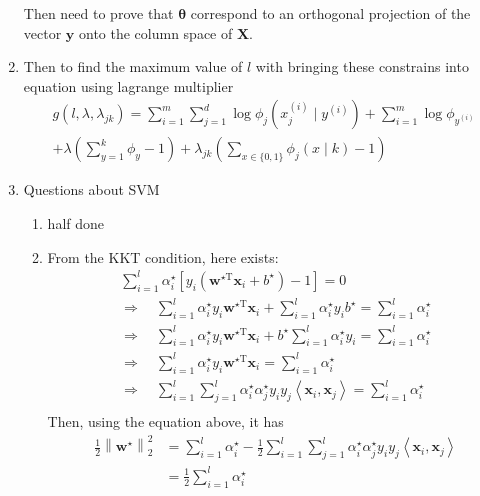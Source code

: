 \documentclass[a4paper]{article}
\begin{document}
\begin{enumerate}
Then need to prove that $\boldsymbol{\theta}$ correspond to an orthogonal projection of the vector $\boldsymbol{y}$ onto the column space of $\boldsymbol{X}$.

\item Then to find the maximum value of $l$ with bringing these constrains into equation using lagrange multiplier
\begin{equation*}
  \begin{aligned}
    g(l, \lambda, \lambda_{jk}) = \sum_{i = 1}^m \sum_{j = 1}^d \log \phi_j (x^{(i)}_j \mid y^{(i)}) + \sum_{i = 1}^m \log \phi_{y^{(i)}} \\
      + \lambda(\sum_{y=1}^k\phi_y - 1) +\lambda_{jk}(\sum_{x \in \{0,1\}}\phi_j(x \mid k)-1)
  \end{aligned}
\end{equation*}
\item Questions about SVM
\begin{enumerate}
  \item half done
  \item From the KKT condition, here exists:
    \begin{equation*}
      \begin{gathered}
        \sum_{i=1}^{l} \alpha_{i}^{\star}\left[y_{i}\left(\boldsymbol{w}^{\star \mathrm{T}} \boldsymbol{x}_{i}+b^{\star}\right)-1\right]=0\\
        \Rightarrow \quad \sum_{i=1}^{l} \alpha_{i}^{\star} y_{i} \boldsymbol{w}^{\star \mathrm{T}} \boldsymbol{x}_{i}+ \sum_{i=1}^{l} \alpha_{i}^{\star} y_{i} b^{\star} = \sum_{i=1}^{l} \alpha_{i}^{\star}\\
        \Rightarrow \quad \sum_{i=1}^{l} \alpha_{i}^{\star} y_{i} \boldsymbol{w}^{\star \mathrm{T}} \boldsymbol{x}_{i}+ b^{\star} \sum_{i=1}^{l} \alpha_{i}^{\star} y_{i} = \sum_{i=1}^{l} \alpha_{i}^{\star}\\
        \Rightarrow \quad \sum_{i=1}^{l} \alpha_{i}^{\star} y_{i} \boldsymbol{w}^{\star \mathrm{T}} \boldsymbol{x}_{i} = \sum_{i=1}^{l} \alpha_{i}^{\star}\\
        \Rightarrow \quad \sum_{i=1}^{l} \sum_{j=1}^{l} \alpha_{i}^{\star} \alpha_{j}^{\star} y_{i} y_{j}\left\langle\boldsymbol{x}_{i}, \boldsymbol{x}_{j}\right\rangle = \sum_{i=1}^{l} \alpha_{i}^{\star}\\
      \end{gathered}
    \end{equation*}
    Then, using the equation above, it has
    \begin{equation*}
      \begin{aligned}
        \frac{1}{2}\left\|\boldsymbol{w}^{\star}\right\|_{2}^{2}
        &=\sum_{i=1}^{l} \alpha_{i}^{\star}-\frac{1}{2} \sum_{i=1}^{l} \sum_{j=1}^{l} \alpha_{i}^{\star} \alpha_{j}^{\star} y_{i} y_{j}\left\langle\boldsymbol{x}_{i}, \boldsymbol{x}_{j}\right\rangle\\
        &=\frac{1}{2} \sum_{i=1}^{l} \alpha_{i}^{\star}\\
      \end{aligned}
    \end{equation*}
\end{enumerate}


\end{enumerate}
\end{document}
